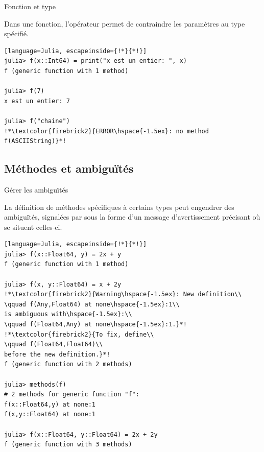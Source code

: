 \begin{frame}[containsverbatim]{Fonction et type}
\par{Dans une fonction, l’opérateur \cmdb{\hspace{-1.5ex}:\hspace{-1.5ex}:} permet de contraindre les paramètres au type spécifié.}
\begin{lstlisting}[language=Julia, escapeinside={!*}{*!}]
julia> f(x::Int64) = print("x est un entier: ", x)
f (generic function with 1 method)

julia> f(7)
x est un entier: 7

julia> f("chaine")
!*\textcolor{firebrick2}{ERROR\hspace{-1.5ex}: no method f(ASCIIString)}*!
\end{lstlisting}
\end{frame}


\subsection{Méthodes et ambiguïtés}
\begin{frame}[containsverbatim]{Gérer les ambiguïtés}
\par{La définition de méthodes spécifiques à certains types peut engendrer des ambiguïtés, signalées par {\Julia} sous la forme d’un message d’avertissement précisant où se situent celles-ci.}
\begin{lstlisting}[language=Julia, escapeinside={!*}{*!}]
julia> f(x::Float64, y) = 2x + y
f (generic function with 1 method)

julia> f(x, y::Float64) = x + 2y
!*\textcolor{firebrick2}{Warning\hspace{-1.5ex}: New definition\\
\qquad f(Any,Float64) at none\hspace{-1.5ex}:1\\
is ambiguous with\hspace{-1.5ex}:\\
\qquad f(Float64,Any) at none\hspace{-1.5ex}:1.}*!
!*\textcolor{firebrick2}{To fix, define\\
\qquad f(Float64,Float64)\\
before the new definition.}*!
f (generic function with 2 methods)

julia> methods(f)
# 2 methods for generic function "f":
f(x::Float64,y) at none:1
f(x,y::Float64) at none:1

julia> f(x::Float64, y::Float64) = 2x + 2y
f (generic function with 3 methods)
\end{lstlisting}
\end{frame}


